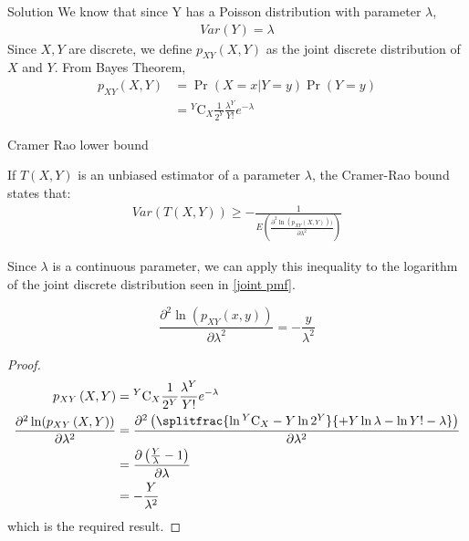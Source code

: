 \documentclass{beamer}
\providecommand{\pr}[1]{\ensuremath{\Pr\left(#1\right)}}
\providecommand{\brak}[1]{\ensuremath{\left(#1\right)}}
\newcommand{\comb}[2]{{}^{#1}\mathrm{C}_{#2}}
\begin{document}
\begin{frame}{Solution}
We know that since Y has a Poisson distribution with parameter $\lambda$, 
\begin{align}
    Var(Y)=\lambda \label{Var=lam}
\end{align}
Since $X, Y$ are discrete, we define $ p_{XY}\brak{X, Y}$ as the joint discrete distribution of $X$ and $Y$.
From Bayes Theorem,
\begin{align}
    p_{XY}\brak{X, Y}&=\pr{X=x|Y=y} \pr{Y=y}  \\
    &= \comb{Y}{X} \frac{1}{2^Y} \frac{\lambda^Y}{Y!} e^{- \lambda}\label{joint pmf}
\end{align} 
    
\end{frame}
\begin{frame}{Cramer Rao lower bound}
\begin{definition} 
If $T(X, Y)$ is an unbiased estimator of a parameter $\lambda$, the Cramer-Rao bound states that:
\begin{align}
    Var\brak{T\brak{X,Y}}\geq -\frac{1}{E\brak{\frac{\partial^2 \ln(p_{XY}\brak{X, Y}))}{\partial\lambda^2}}} \label{def CRB}
\end{align}
\end{definition}
\begin{block}{}
Since $\lambda$ is a continuous parameter, we can apply this inequality to the logarithm of the joint discrete distribution seen in \eqref{joint pmf}.

\end{block}
\end{frame}
\begin{frame}{}
\begin{lemma}
\begin{equation}
    \frac{\partial^2 \ln(p_{XY}\brak{x, y})}{\partial\lambda^2}=-\frac{y}{\lambda^2} \label{partial}
\end{equation}
\end{lemma}
\begin{proof}
\begin{align}
p_{XY}\brak{X, Y}&= \comb{Y}{X} \frac{1}{2^Y} \frac{\lambda^Y}{Y!}e^{- \lambda}\\
\frac{\partial^2 \ln(p_{XY}\brak{X, Y})}{\partial\lambda^2}&=\frac{\partial^2\brak{ \splitfrac{\ln{\comb{Y}{X}}-Y\ln{2^Y}}{+Y\ln{\lambda}-\ln{Y!}-\lambda}}}{\partial\lambda^2}\\
&=\frac{\partial\brak{ \frac{Y}{\lambda}-1}}{\partial\lambda}\\
&=-\frac{Y}{\lambda^2}
\end{align}
which is the required result.
\end{proof}
    
\end{frame}
\end{document}
